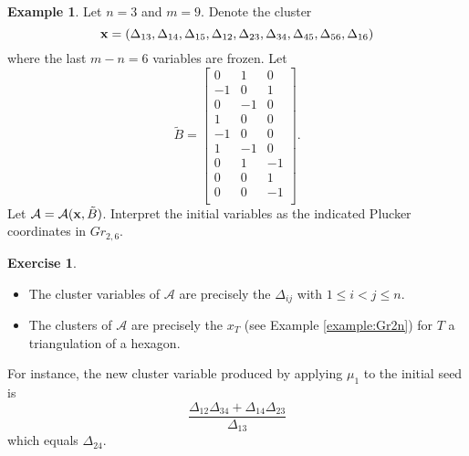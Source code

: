 \documentclass{amsart}
\theoremstyle{definition}
\newtheorem{example}[theorem]{Example}
\newtheorem{subexercise}{Exercise}[theorem]
\theoremstyle{remark}
\numberwithin{equation}{section}
\newcommand{\cA}{{\mathcal{A}}}
\newcommand{\x}{{\bf x}}
\begin{document}
	\begin{example}
		Let $n=3$ and $m=9$.  Denote the cluster 
		\begin{displaymath}
			\x = (\Delta_{13},\Delta_{14},\Delta_{15}, \Delta_{12},\Delta_{23},\Delta_{34},\Delta_{45},\Delta_{56},\Delta_{16})
		\end{displaymath}
		where the last $m-n=6$ variables are frozen.  Let
		\begin{displaymath}
			\tilde{B} = \left[\begin{array}{ccc}
			0 & 1 & 0 \\
			-1 & 0 & 1 \\
			0 & -1 & 0 \\
			1 & 0 & 0 \\
			-1 & 0 & 0 \\
			1 & -1 & 0 \\
			0 & 1 & -1 \\
			0 & 0 & 1 \\
			0 & 0 & -1 \\
			\end{array}
			\right].
		\end{displaymath}
		Let $\cA = \cA(\x,\tilde{B})$.  Interpret the initial variables as the indicated Plucker coordinates in $Gr_{2,6}$.
		
		\begin{subexercise} \ \newline
			\begin{itemize}
			\item The cluster variables of $\cA$ are precisely the $\Delta_{ij}$ with $1 \leq i < j \leq n$.
			\item The clusters of $\cA$ are precisely the $x_T$ (see Example \ref{example:Gr2n}) for $T$ a triangulation of a hexagon. 
			\end{itemize}
		\end{subexercise}
		For instance, the new cluster variable produced by applying $\mu_1$ to the initial seed is
		\begin{displaymath}
		\frac{\Delta_{12}\Delta_{34} + \Delta_{14}\Delta_{23}}{\Delta_{13}}
		\end{displaymath}
		which equals $\Delta_{24}$.
	\end{example}
	
\end{document}

